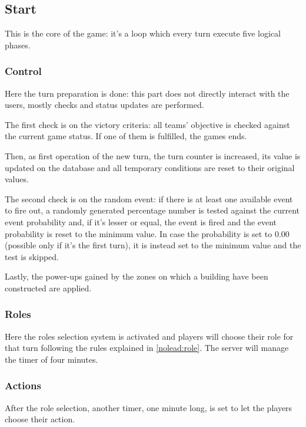 		\subsection{Start}
		\label{workflow:start}
			
			This is the core of the game: it's a loop which every turn execute five logical phases.
				
			\subsubsection{Control}
			
				Here the turn preparation is done: this part does not directly interact with the users, mostly checks and status updates are performed.
			
				The first check is on the victory criteria: all teams' objective is checked against the current game status. If one of them is fulfilled, the games ends.
				
				Then, as first operation of the new turn, the turn counter is increased, its value is updated on the database and all temporary conditions are reset to their original values.
				
				The second check is on the random event: if there is at least one available event to fire out, a randomly generated percentage number is tested against the current event probability and, if it's lesser or equal, the event is fired and the event probability is reset to the minimum value.
				In case the probability is set to 0.00 (possible only if it's the first turn), it is instead set to the minimum value and the test is skipped.
				
				Lastly, the power-ups gained by the zones on which a building have been constructed are applied.
				
			\subsubsection{Roles}
			
				Here the roles selection system is activated and players will choose their role for that turn following the rules explained in \autoref{nolead:role}.
				The server will manage the timer of four minutes.
				
			\subsubsection{Actions}
				
				After the role selection, another timer, one minute long, is set to let the players choose their action.
				
